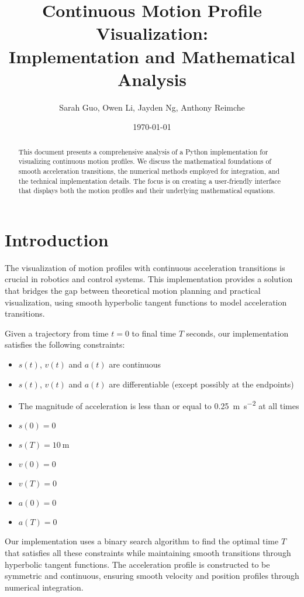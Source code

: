 \documentclass[12pt,a4paper]{article}
\title{Continuous Motion Profile Visualization:\\Implementation and Mathematical Analysis}
\author{Sarah Guo, Owen Li, Jayden Ng, Anthony Reimche}
\date{\today}
\begin{document}
\maketitle

\begin{abstract}
This document presents a comprehensive analysis of a Python implementation for visualizing continuous motion profiles. We discuss the mathematical foundations of smooth acceleration transitions, the numerical methods employed for integration, and the technical implementation details. The focus is on creating a user-friendly interface that displays both the motion profiles and their underlying mathematical equations.
\end{abstract}

\tableofcontents

\section{Introduction}
The visualization of motion profiles with continuous acceleration transitions is crucial in robotics and control systems. This implementation provides a solution that bridges the gap between theoretical motion planning and practical visualization, using smooth hyperbolic tangent functions to model acceleration transitions.

Given a trajectory from time $t=0$ to final time $T$ seconds, our implementation satisfies the following constraints:

\begin{itemize}
\item $s(t)$, $v(t)$ and $a(t)$ are continuous
\item $s(t)$, $v(t)$ and $a(t)$ are differentiable (except possibly at the endpoints)
\item The magnitude of acceleration is less than or equal to \SI{0.25}{\meter\per\second\squared} at all times
\item $s(0) = 0$
\item $s(T) = \SI{10}{\meter}$
\item $v(0) = 0$
\item $v(T) = 0$
\item $a(0) = 0$
\item $a(T) = 0$
\end{itemize}

Our implementation uses a binary search algorithm to find the optimal time $T$ that satisfies all these constraints while maintaining smooth transitions through hyperbolic tangent functions. The acceleration profile is constructed to be symmetric and continuous, ensuring smooth velocity and position profiles through numerical integration.
\end{document}
